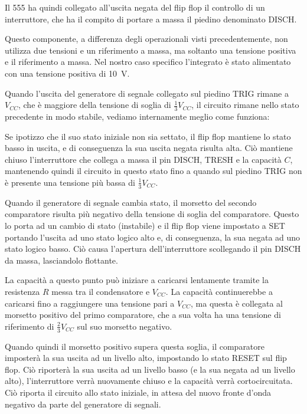Il 555 ha quindi collegato all'uscita negata del flip flop il controllo di un interruttore, che ha il compito di portare a massa il piedino denominato DISCH.

\noindent
Questo componente, a differenza degli operazionali visti precedentemente, non utilizza due tensioni e un riferimento a massa, ma soltanto una tensione positiva e il riferimento a massa. Nel nostro caso specifico l'integrato è stato alimentato con una tensione positiva di \SI{10}{\volt}.

\noindent
Quando l'uscita del generatore di segnale collegato sul piedino TRIG rimane a $V_{CC}$, che è maggiore della tensione di soglia di $\frac{1}{3}V_{CC}$, il circuito rimane nello stato precedente in modo stabile, vediamo internamente meglio come funziona:

\noindent
Se ipotizzo che il suo stato iniziale non sia settato, il flip flop mantiene lo stato basso in uscita, e di conseguenza la sua uscita negata risulta alta. Ciò mantiene chiuso l'interruttore che collega a massa il pin DISCH, TRESH e la capacità $C$, mantenendo quindi il circuito in questo stato fino a quando sul piedino TRIG non è presente una tensione più bassa di $\frac{1}{3}V_{CC}$. 

\noindent
Quando il generatore di segnale cambia stato, il morsetto del secondo comparatore risulta più negativo della tensione di soglia del comparatore. Questo lo porta ad un cambio di stato (instabile) e il flip flop viene impostato a SET portando l'uscita ad uno stato logico alto e, di conseguenza, la sua negata ad uno stato logico basso. Ciò causa l'apertura dell'interruttore scollegando il pin DISCH da massa, lasciandolo flottante.

\noindent
La capacità a questo punto può iniziare a caricarsi lentamente tramite la resistenza $R$ messa tra il condensatore e $V_{CC}$. La capacità continuerebbe a caricarsi fino a raggiungere una tensione pari a $V_{CC}$, ma questa è collegata al morsetto positivo del primo comparatore, che a sua volta ha una tensione di riferimento di $\frac{2}{3}V_{CC}$ sul suo morsetto negativo. 

\noindent
Quando quindi il morsetto positivo supera questa soglia, il comparatore imposterà la sua uscita ad un livello alto, impostando lo stato RESET sul flip flop. Ciò riporterà la sua uscita ad un livello basso (e la sua negata ad un livello alto), l'interruttore verrà nuovamente chiuso e la capacità verrà cortocircuitata. Ciò riporta il circuito allo stato iniziale, in attesa del nuovo fronte d'onda negativo da parte del generatore di segnali.

